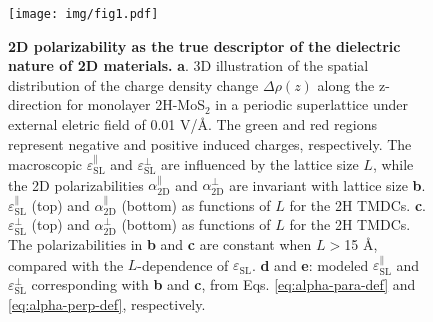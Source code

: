 \documentclass[journal=ancac3,manuscript=article,email=true,hyperref=true,keywords=false]{achemso}
\begin{document}


\label{sec:org34cbe74}
\begin{figure}[H]
\centering
\texttt{[image: img/fig1.pdf]}
\caption{\label{fig-1} \textbf{2D polarizability as the true
    descriptor of the dielectric nature of 2D materials.}
  \textbf{a}. 3D illustration of the spatial distribution of the
  charge density change $\Delta \rho(z)$ along the z-direction for
  monolayer 2H-MoS$_{2}$ in a periodic superlattice under external
  eletric field of 0.01 V/\AA{}.  The green and red regions represent
  negative and positive induced charges, respectively. The macroscopic
  $\varepsilon_{\mathrm{SL}}^{\parallel}$ and
  $\varepsilon_{\mathrm{SL}}^{\perp}$ are influenced by the lattice
  size $L$, while the 2D polarizabilities $\alpha_{\mathrm{2D}}^{\parallel}$ and
  $\alpha_{\mathrm{2D}}^{\perp}$ are invariant with lattice size \textbf{b}.
  $\varepsilon^{\parallel}_{\mathrm{SL}}$ (top) and
  $\alpha_{\mathrm{2D}}^{\parallel}$ (bottom) as functions of $L$ for
  the 2H TMDCs. \textbf{c}.  $\varepsilon^{\perp}_{\mathrm{SL}}$ (top)
  and $\alpha_{\mathrm{2D}}^{\perp}$ (bottom) as functions of $L$ for
  the 2H TMDCs. The polarizabilities in \textbf{b} and \textbf{c} are
  constant when $L>$15 \AA{}, compared with the $L$-dependence of
  $\varepsilon_{\mathrm{SL}}$. \textbf{d} and \textbf{e}: modeled
  $\varepsilon_{\mathrm{SL}}^{\parallel}$ and
  $\varepsilon_{\mathrm{SL}}^{\perp}$ corresponding with \textbf{b}
  and \textbf{c}, from Eqs. \ref{eq:alpha-para-def} and
  \ref{eq:alpha-perp-def}, respectively.
}
\end{figure}

\end{document}
